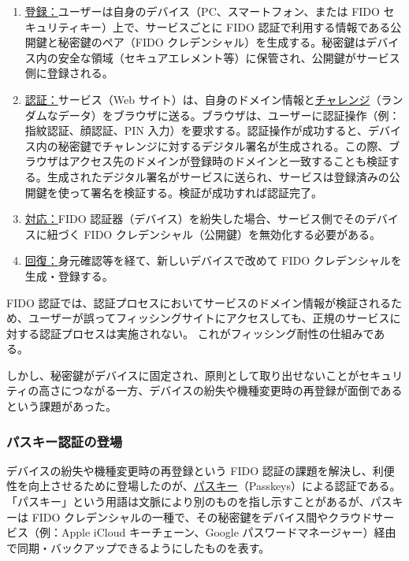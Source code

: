 \documentclass[uplatex]{jsarticle}
\def\label#1{}%
\begin{document}
\begin{enumerate}
\item \underline{登録：}ユーザーは自身のデバイス（PC、スマートフォン、または FIDO セキュリティキー）上で、サービスごとに FIDO 認証で利用する情報である公開鍵と秘密鍵のペア（FIDO クレデンシャル）を生成する。秘密鍵はデバイス内の安全な領域（セキュアエレメント等）に保管され、公開鍵がサービス側に登録される。
\item \underline{認証：}サービス（Web サイト）は、自身のドメイン情報と\underline{チャレンジ}（ランダムなデータ）をブラウザに送る。ブラウザは、ユーザーに認証操作（例：指紋認証、顔認証、PIN 入力）を要求する。認証操作が成功すると、デバイス内の秘密鍵でチャレンジに対するデジタル署名が生成される。この際、ブラウザはアクセス先のドメインが登録時のドメインと一致することも検証する。生成されたデジタル署名がサービスに送られ、サービスは登録済みの公開鍵を使って署名を検証する。検証が成功すれば認証完了。
\item \underline{対応：}FIDO 認証器（デバイス）を紛失した場合、サービス側でそのデバイスに紐づく FIDO クレデンシャル（公開鍵）を無効化する必要がある。
\item \underline{回復：}身元確認等を経て、新しいデバイスで改めて FIDO クレデンシャルを生成・登録する。
\end{enumerate}

FIDO 認証では、認証プロセスにおいてサービスのドメイン情報が検証されるため、ユーザーが誤ってフィッシングサイトにアクセスしても、正規のサービスに対する認証プロセスは実施されない。
これがフィッシング耐性の仕組みである。

\begin{rem}\label{rem:ch2-fido-issue}
しかし、秘密鍵がデバイスに固定され、原則として取り出せないことがセキュリティの高さにつながる一方、デバイスの紛失や機種変更時の再登録が面倒であるという課題があった。
\end{rem}

\subsubsection{パスキー認証の登場}

\begin{dfn}[パスキー]\label{dfn:passkey}
デバイスの紛失や機種変更時の再登録という FIDO 認証の課題を解決し、利便性を向上させるために登場したのが、\underline{パスキー}（Passkeys）による認証である。
「パスキー」という用語は文脈により別のものを指し示すことがあるが、パスキーは FIDO クレデンシャルの一種で、その秘密鍵をデバイス間やクラウドサービス（例：Apple iCloud キーチェーン、Google パスワードマネージャー）経由で同期・バックアップできるようにしたものを表す。
\end{dfn}
\end{document}
